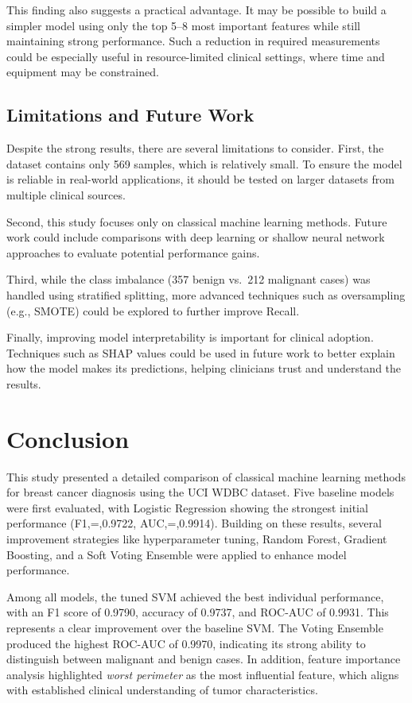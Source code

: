 \documentclass[conference]{IEEEtran}
\begin{document}
This finding also suggests a practical advantage. It may be possible to build a simpler model using only the top 5–8 most important features while still maintaining strong performance. Such a reduction in required measurements could be especially useful in resource-limited clinical settings, where time and equipment may be constrained.

\subsection{Limitations and Future Work}

Despite the strong results, there are several limitations to consider. First, the dataset contains only 569 samples, which is relatively small. To ensure the model is reliable in real-world applications, it should be tested on larger datasets from multiple clinical sources.

Second, this study focuses only on classical machine learning methods. Future work could include comparisons with deep learning or shallow neural network approaches to evaluate potential performance gains.

Third, while the class imbalance (357 benign vs.\ 212 malignant cases) was handled using stratified splitting, more advanced techniques such as oversampling (e.g., SMOTE) could be explored to further improve Recall.

Finally, improving model interpretability is important for clinical adoption. Techniques such as SHAP values could be used in future work to better explain how the model makes its predictions, helping clinicians trust and understand the results.

\section{Conclusion}

This study presented a detailed comparison of classical machine learning methods for breast cancer diagnosis using the UCI WDBC dataset. Five baseline models were first evaluated, with Logistic Regression showing the strongest initial performance (F1,=,0.9722, AUC,=,0.9914). Building on these results, several improvement strategies like hyperparameter tuning, Random Forest, Gradient Boosting, and a Soft Voting Ensemble were applied to enhance model performance.

Among all models, the tuned SVM achieved the best individual performance, with an F1 score of 0.9790, accuracy of 0.9737, and ROC-AUC of 0.9931. This represents a clear improvement over the baseline SVM. The Voting Ensemble produced the highest ROC-AUC of 0.9970, indicating its strong ability to distinguish between malignant and benign cases. In addition, feature importance analysis highlighted \textit{worst perimeter} as the most influential feature, which aligns with established clinical understanding of tumor characteristics.
\end{document}

